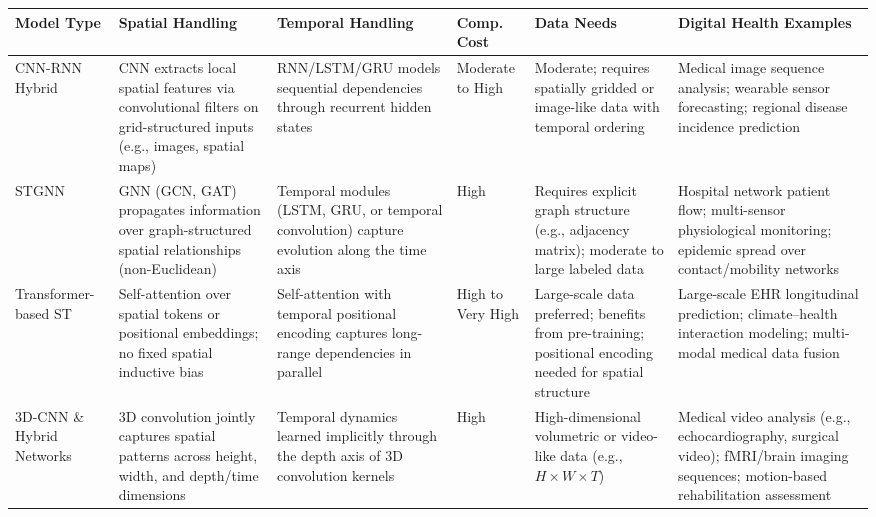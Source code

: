 \documentclass[journal]{IEEEtran}
\begin{document}
\begin{table}[htbp]
\begin{tabularx}{\textwidth}{>{\raggedright\arraybackslash}p{2.4cm} >{\raggedright\arraybackslash}X >{\raggedright\arraybackslash}p{4.0cm} >{\raggedright\arraybackslash}X}
\bottomrule
\end{tabularx}
\else
\footnotesize
\renewcommand{\arraystretch}{1.0}
\begin{tabularx}{\textwidth}{>{\raggedright\arraybackslash}p{2.2cm} >{\raggedright\arraybackslash}p{2.5cm} >{\raggedright\arraybackslash}p{2.5cm} >{\raggedright\arraybackslash}p{1.4cm} >{\raggedright\arraybackslash}p{1.8cm} >{\raggedright\arraybackslash}X}
\toprule
\textbf{Model Type} & \textbf{Spatial Handling} & \textbf{Temporal Handling} & \textbf{Comp. Cost} & \textbf{Data Needs} & \textbf{Digital Health Examples} \\
\midrule
 
CNN-RNN Hybrid
& CNN extracts local spatial features via convolutional filters on grid-structured inputs (e.g., images, spatial maps)
& RNN/LSTM/GRU models sequential dependencies through recurrent hidden states
& Moderate to High
& Moderate; requires spatially gridded or image-like data with temporal ordering
& Medical image sequence analysis; wearable sensor forecasting; regional disease incidence prediction \\
 
\addlinespace[4pt]
 
STGNN
& GNN (GCN, GAT) propagates information over graph-structured spatial relationships (non-Euclidean)
& Temporal modules (LSTM, GRU, or temporal convolution) capture evolution along the time axis
& High
& Requires explicit graph structure (e.g., adjacency matrix); moderate to large labeled data
& Hospital network patient flow; multi-sensor physiological monitoring; epidemic spread over contact/mobility networks \\
 
\addlinespace[4pt]
 
Transformer-based ST
& Self-attention over spatial tokens or positional embeddings; no fixed spatial inductive bias
& Self-attention with temporal positional encoding captures long-range dependencies in parallel
& High to Very High
& Large-scale data preferred; benefits from pre-training; positional encoding needed for spatial structure
& Large-scale EHR longitudinal prediction; climate--health interaction modeling; multi-modal medical data fusion \\

\addlinespace[4pt]

3D-CNN \& Hybrid Networks
& 3D convolution jointly captures spatial patterns across height, width, and depth/time dimensions
& Temporal dynamics learned implicitly through the depth axis of 3D convolution kernels
& High
& High-dimensional volumetric or video-like data (e.g., $H \times W \times T$)
& Medical video analysis (e.g., echocardiography, surgical video); fMRI/brain imaging sequences; motion-based rehabilitation assessment \\


\end{tabularx}
\end{table}
\end{document}
